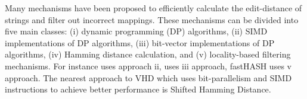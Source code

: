 Many mechanisms have been proposed to efficiently calculate the edit-distance of strings and filter out incorrect mappings. These mechanisms can be divided into five main classes: (i) dynamic programming (DP) algorithms, (ii) SIMD implementations of DP algorithms, (iii) bit-vector implementations of DP algorithms, (iv) Hamming distance calculation, and (v) locality-based filtering mechanisms. For instance \cite{swps3} uses approach ii, \cite{seqan} uses iii approach, fastHASH\cite{fasthash} uses v approach. The nearest approach to VHD which uses bit-parallelism and SIMD instructions to achieve better performance is Shifted Hamming Distance\cite{shd}.
  